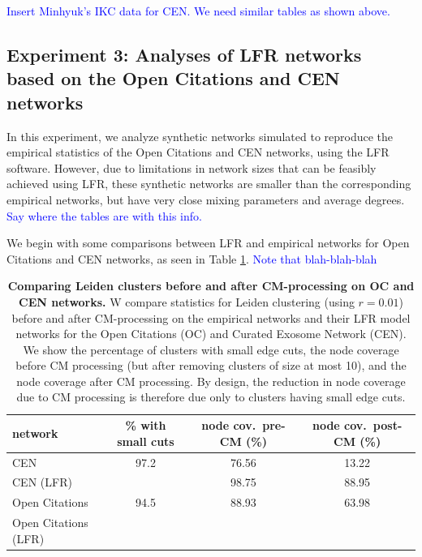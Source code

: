 \documentclass[11pt]{article}   	%
\begin{document}
\textcolor{blue}{Insert Minhyuk's IKC data for CEN. We need similar tables as shown above. }


\subsection{Experiment 3: Analyses of LFR networks based on the Open Citations and CEN networks}



In this experiment, we analyze synthetic networks simulated to reproduce the empirical statistics of the Open Citations and CEN networks, using the
LFR software.
However, due to limitations in network sizes that can be feasibly achieved using LFR, these synthetic networks are smaller than the corresponding
empirical networks, but have very close mixing parameters and average degrees.
\textcolor{blue}{Say where the tables are with this info.}


We begin with some comparisons between LFR and empirical networks for Open Citations and CEN networks, as seen in
Table \ref{tab:LFR-vs-empirical-OC-CEN}. \textcolor{blue}{Note that blah-blah-blah}
\begin{table}[ht]
\centering
\begin{tabular}{lccc}
  \hline
 network & \% with small cuts & node cov.~pre-CM (\%) & node cov.~post-CM (\%) \\
   \hline
   CEN  &97.2 &76.56 &13.22 \\
   CEN (LFR) &  & 98.75 & 88.95\\
   \hline
   Open Citations  &94.5&88.93&63.98 \\
   Open Citations (LFR) &&&\\
   \hline
\end{tabular}
\caption{\textbf{Comparing Leiden clusters before and after CM-processing  on   OC and CEN networks.} W compare statistics for Leiden clustering (using $r=0.01$) before and after CM-processing on the empirical networks and their LFR model
networks for the Open Citations (OC)  and Curated Exosome Network (CEN). We show the percentage of clusters with small edge cuts, the node coverage before CM processing (but after removing clusters of size at most 10), and the node coverage
after CM processing.  By design, the reduction in node coverage due to CM processing  is therefore due only to clusters having small edge cuts.}
\label{tab:LFR-vs-empirical-OC-CEN}
\end{table}
\end{document}
